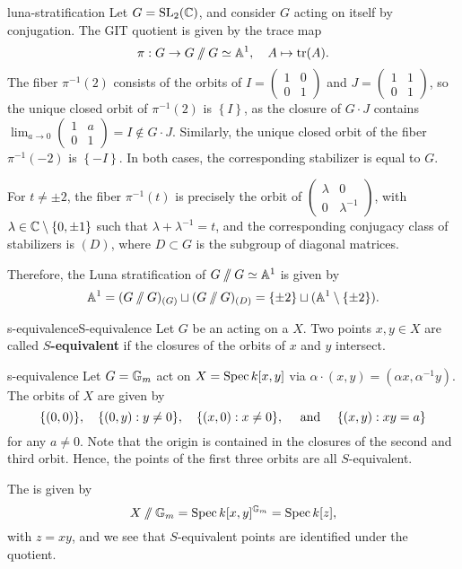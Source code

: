 \begin{example}{luna-stratification}
    Let $G = \textup{SL}_2(\CC)$, and consider $G$ acting on itself by conjugation. The GIT quotient is given by the trace map
    \[ \pi : G \to G \sslash G \simeq \AA^1, \quad A \mapsto \tr(A) . \]
    The fiber $\pi^{-1}(2)$ consists of the orbits of $I = \left(\begin{smallmatrix} 1 & 0 \\ 0 & 1 \end{smallmatrix}\right)$ and $J = \left(\begin{smallmatrix} 1 & 1 \\ 0 & 1 \end{smallmatrix} \right)$, so the unique closed orbit of $\pi^{-1}(2)$ is $\left\{ I \right\}$, as the closure of $G \cdot J$ contains $\lim_{a \to 0} \left(\begin{smallmatrix} 1 & a \\ 0 & 1 \end{smallmatrix}\right) = I \not\in G \cdot J$. Similarly, the unique closed orbit of the fiber $\pi^{-1}(-2)$ is $\left\{ -I \right\}$. In both cases, the corresponding stabilizer is equal to $G$.
    
    For $t \ne \pm 2$, the fiber $\pi^{-1}(t)$ is precisely the orbit of $\left(\begin{smallmatrix} \lambda & 0 \\ 0 & \lambda^{-1} \end{smallmatrix}\right)$, with $\lambda \in \CC \setminus \{ 0, \pm 1 \}$ such that $\lambda + \lambda^{-1} = t$, and the corresponding conjugacy class of stabilizers is $(D)$, where $D \subset G$ is the subgroup of diagonal matrices.
    
    Therefore, the Luna stratification of $G \sslash G \simeq \AA^1$ is given by
    \[ \AA^1 = (G \sslash G)_{(G)} \sqcup (G \sslash G)_{(D)}  = \{ \pm 2 \} \sqcup (\AA^1 \setminus \{ \pm 2 \}) . \]
\end{example}

\begin{topic}{s-equivalence}{S-equivalence}
    Let $G$ be an  acting on a  $X$. Two points $x, y \in X$ are called \textbf{$S$-equivalent} if the closures of the orbits of $x$ and $y$ intersect.
\end{topic}

\begin{example}{s-equivalence}
    Let $G = \GG_m$ act on $X = \Spec k[x, y]$ via $\alpha \cdot (x, y) = (\alpha x, \alpha^{-1} y)$. The orbits of $X$ are given by
    \[ \{ (0, 0) \}, \quad \{ (0, y) : y \ne 0  \}, \quad \{ (x, 0) : x \ne 0  \}, \quad \textup{ and } \quad \{ (x, y) : xy = a \}  \]
    for any $a \ne 0$. Note that the origin is contained in the closures of the second and third orbit. Hence, the points of the first three orbits are all $S$-equivalent.
    
    The  is given by
    \[ X \sslash \GG_m = \Spec k[x, y]^{\GG_m} = \Spec k[z] , \]
    with $z = xy$, and we see that $S$-equivalent points are identified under the quotient.
\end{example}
